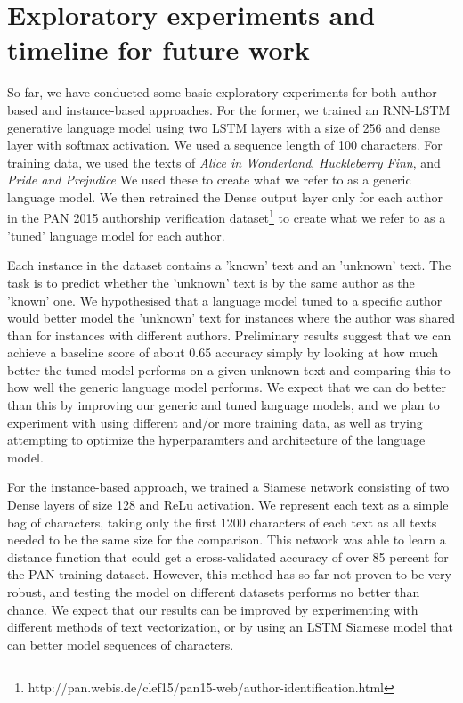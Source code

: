 \section*{Exploratory experiments and timeline for future work}
So far, we have conducted some basic exploratory experiments for both author-based and instance-based approaches. For the former, we trained an RNN-LSTM generative language model using two LSTM layers with a size of 256 and dense layer with softmax activation. We used a sequence length of 100 characters. For training data, we used the texts of
\textit{Alice in Wonderland}, 
\textit{Huckleberry Finn}, and 
\textit{Pride and Prejudice} 
We used these to create what we refer to as a generic language model. We then retrained the Dense output layer only for each author in the PAN 2015 authorship verification dataset\footnote{http://pan.webis.de/clef15/pan15-web/author-identification.html} to create what we refer to as a 'tuned' language model for each author.

Each instance in the dataset contains a 'known' text and an 'unknown' text. The task is to predict whether the 'unknown' text is by the same author as the 'known' one. We hypothesised that a language model tuned to a specific author would better model the 'unknown' text for instances where the author was shared than for instances with different authors. Preliminary results suggest that we can achieve a baseline score of about 0.65 accuracy simply by looking at how much better the tuned model performs on a given unknown text and comparing this to how well the generic language model performs. We expect that we can do better than this by improving our generic and tuned language models, and we plan to experiment with using different and/or more training data, as well as trying attempting to optimize the hyperparamters and architecture of the language model.

For the instance-based approach, we trained a Siamese network consisting of two Dense layers of size 128 and ReLu activation. We represent each text as a simple bag of characters, taking only the first 1200 characters of each text as all texts needed to be the same size for the comparison. This network was able to learn a distance function that could get a cross-validated accuracy of over 85 percent for the PAN training dataset. However, this method has so far not proven to be very robust, and testing the model on different datasets performs no better than chance. We expect that our results can be improved by experimenting with different methods of text vectorization, or by using an LSTM Siamese model that can better model sequences of characters.

